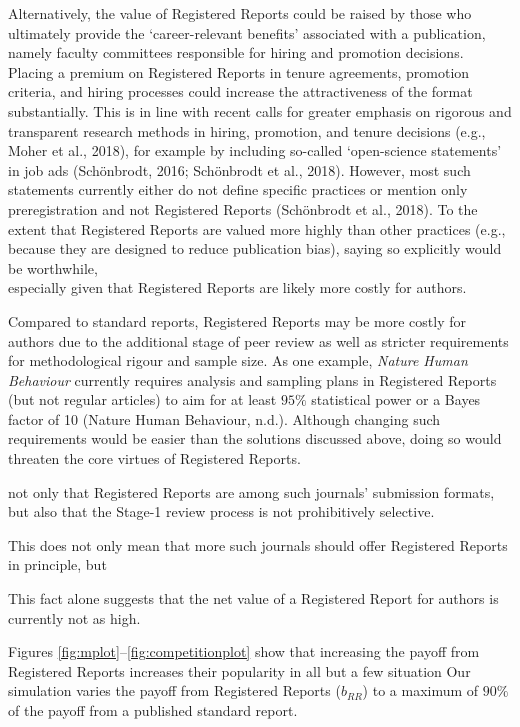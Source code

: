 \documentclass[
  ,man,mask,floatsintext]{apa6}
\begin{document}
Alternatively, the value of Registered Reports could be raised by those who ultimately provide the `career-relevant benefits' associated with a publication, namely faculty committees responsible for hiring and promotion decisions.
Placing a premium on Registered Reports in tenure agreements, promotion criteria, and hiring processes could increase the attractiveness of the format substantially.
This is in line with recent calls for greater emphasis on rigorous and transparent research methods in hiring, promotion, and tenure decisions (e.g., Moher et al., 2018), for example by including so-called `open-science statements' in job ads (Schönbrodt, 2016; Schönbrodt et al., 2018).
However, most such statements currently either do not define specific practices or mention only preregistration and not Registered Reports (Schönbrodt et al., 2018).
To the extent that Registered Reports are valued more highly than other practices (e.g., because they are designed to reduce publication bias), saying so explicitly would be worthwhile,\\
especially given that Registered Reports are likely more costly for authors.

Compared to standard reports, Registered Reports may be more costly for authors due to the additional stage of peer review
as well as stricter requirements for methodological rigour and sample size.
As one example, \emph{Nature Human Behaviour} currently requires analysis and sampling plans in Registered Reports (but not regular articles) to aim for at least \(95\%\) statistical power or a Bayes factor of 10 (Nature Human Behaviour, n.d.).
Although changing such requirements would be easier than the solutions discussed above, doing so would threaten the core virtues of Registered Reports.

not only that Registered Reports are among such journals' submission formats, but also that the Stage-1 review process is not prohibitively selective.

This does not only mean that more such journals should offer Registered Reports in principle, but

This fact alone suggests that the net value of a Registered Report for authors is currently not as high.

Figures \ref{fig:mplot}--\ref{fig:competitionplot} show that increasing the payoff from Registered Reports increases their popularity in all but a few situation
Our simulation varies the payoff from Registered Reports (\(b_{RR}\)) to a maximum of \(90\%\) of the payoff from a published standard report.
\end{document}
